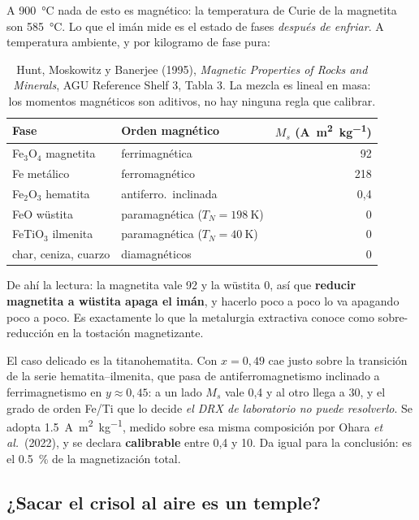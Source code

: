 \documentclass[11pt,a4paper]{article}
\begin{document}
A \SI{900}{\celsius} nada de esto es magnético: la temperatura de Curie de la
magnetita son \SI{585}{\celsius}. Lo que el imán mide es el estado de fases
\emph{después de enfriar}. A temperatura ambiente, y por kilogramo de fase pura:

\begin{table}[H]
\centering
\small
\begin{tabular}{llr}
\toprule
\textbf{Fase} & \textbf{Orden magnético} & \textbf{$M_s$ (\si{\ampere\meter\squared\per\kilo\gram})} \\
\midrule
Fe$_3$O$_4$ magnetita & ferrimagnética & 92 \\
Fe metálico & ferromagnético & 218 \\
Fe$_2$O$_3$ hematita & antiferro.\ inclinada & 0,4 \\
FeO wüstita & paramagnética ($T_N = \SI{198}{\kelvin}$) & 0 \\
FeTiO$_3$ ilmenita & paramagnética ($T_N = \SI{40}{\kelvin}$) & 0 \\
char, ceniza, cuarzo & diamagnéticos & 0 \\
\bottomrule
\end{tabular}
\caption{Hunt, Moskowitz y Banerjee (1995), \emph{Magnetic Properties of Rocks
and Minerals}, AGU Reference Shelf 3, Tabla 3. La mezcla es lineal en masa: los
momentos magnéticos son aditivos, no hay ninguna regla que calibrar.}
\end{table}

De ahí la lectura: la magnetita vale 92 y la wüstita 0, así que \textbf{reducir
magnetita a wüstita apaga el imán}, y hacerlo poco a poco lo va apagando poco a
poco. Es exactamente lo que la metalurgia extractiva conoce como sobre-reducción
en la tostación magnetizante.

El caso delicado es la titanohematita. Con $x = 0{,}49$ cae justo sobre la
transición de la serie hematita--ilmenita, que pasa de antiferromagnetismo
inclinado a ferrimagnetismo en $y \approx 0{,}45$: a un lado $M_s$ vale 0,4 y al
otro llega a \num{30}, y el grado de orden Fe/Ti que lo decide \emph{el DRX de
laboratorio no puede resolverlo}. Se adopta
\qty{1.5}{\ampere\meter\squared\per\kilo\gram}, medido sobre esa misma
composición por Ohara \emph{et al.}\ (2022), y se declara \textbf{calibrable}
entre 0,4 y 10. Da igual para la conclusión: es el \qty{0.5}{\percent} de la
magnetización total.

\subsection{¿Sacar el crisol al aire es un temple?}
\end{document}
